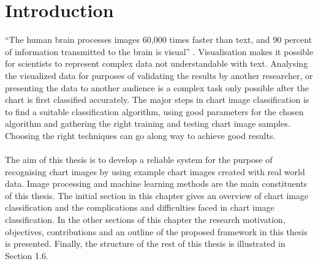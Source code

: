 \documentclass[12pt, a4paper,oneside]{report}
\begin{document}

\setcounter{tocdepth}{10}

\clearpage
\tableofcontents





\listoffigures
\listoftables

\titleformat{\chapter}{\LARGE\bfseries}{\thechapter}{1em}{}

\newpage


\newpage
\chapter{Introduction}
``The human brain processes images 60,000 times faster than text, and 90 percent of information transmitted to the brain is visual'' \cite{humaneye}. Visualisation makes it possible for scientists to represent complex data not understandable with text. Analysing the visualized data for purposes of validating the results by another researcher, or presenting the data to another audience is a complex task only possible after the chart is first classified accurately. The major steps in chart image classification is to find a suitable classification algorithm, using good parameters for the chosen algorithm and gathering the right training and testing chart image samples. Choosing the right techniques can go along way to achieve good results. \\\\
The aim of this thesis is to develop a reliable system for the purpose of recognising chart images by using example chart images created with real world data. Image processing and machine learning methods are the main constituents of this thesis. The initial section in this chapter gives an overview of chart image classification and the complications and difficulties faced in chart image classification. In the other sections of this chapter the research motivation, objectives, contributions and an outline of
the proposed framework in this thesis is presented. Finally, the structure of the rest of this thesis is illustrated in Section 1.6.
\end{document}
